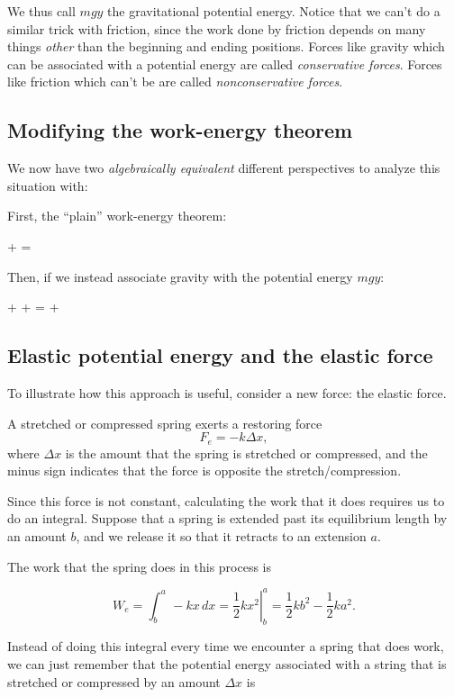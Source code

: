 \documentclass[10pt]{article}
\begin{document}
We thus call $mgy$ the gravitational potential energy. Notice that we can't do a similar trick with
friction, since the work done by friction depends on many things {\it other} than the beginning and ending positions. Forces like gravity which can be associated with a potential energy are called {\it conservative forces}. Forces like friction which can't be are called {\it nonconservative forces}.

\subsection{Modifying the work-energy theorem}

We now have two {\it algebraically equivalent} different perspectives to analyze this situation with:

First, the ``plain'' work-energy theorem:

 +  = 

Then, if we instead associate gravity with the potential energy $mgy$:

 +  +  =  + 

\subsection{Elastic potential energy and the elastic force}

To illustrate how this approach is useful, consider a new force: the elastic force.

A stretched or compressed spring exerts a restoring force $$F_e = -k\Delta x,$$ where $\Delta x$ is the amount that the spring is stretched or compressed, and the minus sign indicates that the force is opposite the stretch/compression.

Since this force is not constant, calculating the work that it does requires us to do an integral. Suppose that a spring is extended past its equilibrium length by an amount $b$, and we release it so that it retracts to an extension $a$.

The work that the spring does in this process is 

$$W_e = \int_b^a\, -kx\, dx = \left.\frac{1}{2}kx^2\right|_b^a =\frac{1}{2}kb^2 - \frac{1}{2}ka^2.$$

Instead of doing this integral every time we encounter a spring that does work, we can just remember that the potential energy associated with a string that is stretched or compressed by an amount $\Delta x$ is 
\end{document}

